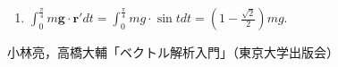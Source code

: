\documentclass{jarticle}
\begin{document}
\begin{enumerate}
      \item  $\int_{0}^{\frac {\pi}{4} } m \bm g \cdot \bm r' dt = \int_{0}^{\frac {\pi}{4} } m g \cdot \sin t dt = \left (1-\frac{\sqrt{2}}{2} \right) mg.$
      
  \end{enumerate}


\newpage

\begin{thebibliography}{99}
 小林亮，高橋大輔「ベクトル解析入門」（東京大学出版会）
\end{thebibliography}
\end{document}
